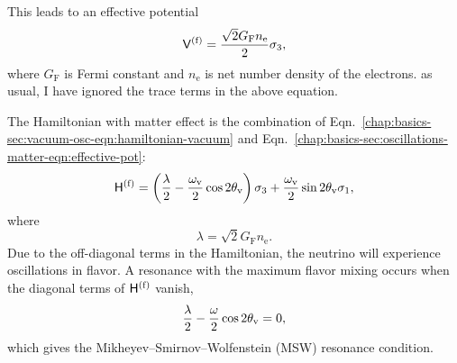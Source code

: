 This leads to an effective potential
\begin{equation}
\mathsf V^{(\ff)} = \frac{\sqrt{2}G_{\mathrm F} n_{\mathrm e} }{2}  \sigma_3,
\label{chap:basics-sec:oscillations-matter-eqn:effective-pot}
\end{equation}
where $G_{\mathrm F}$ is Fermi constant and $n_{\mathrm e}$ is net number density of the electrons. as usual, I have ignored the trace terms in the above equation.

The Hamiltonian with matter effect is the combination of Eqn.~\ref{chap:basics-sec:vacuum-osc-eqn:hamiltonian-vacuum} and Eqn.~\ref{chap:basics-sec:oscillations-matter-eqn:effective-pot}:
\begin{equation}
\mathsf H^{(\ff)} = \left(\frac{\lambda}{2} -\frac{ \omega_\vv }{2} \cos 2\theta_\vv \right) {\sigma}_3  + \frac{ \omega_\vv }{2} \sin 2\theta_\vv {\sigma}_1,
\label{chap:basics-sec:msw-eqn:hamiltonian-matter-effect}
\end{equation}
where
\begin{equation}
  \lambda = \sqrt{2}G_{\mathrm F} n_{\mathrm e}.
  \label{chap:basics-sec:oscillations-matter-eqn:lambda}
\end{equation}
Due to the off-diagonal terms in the Hamiltonian, the neutrino will experience oscillations in flavor. A resonance with the maximum flavor mixing occurs when the diagonal terms of $\mathsf H^{(\mathrm f)}$ vanish,
\begin{equation}
\frac{\lambda}{2} -\frac{ \omega }{2} \cos 2\theta_\mathrm v  = 0,
\end{equation}
which gives the Mikheyev--Smirnov--Wolfenstein (MSW) resonance condition.


